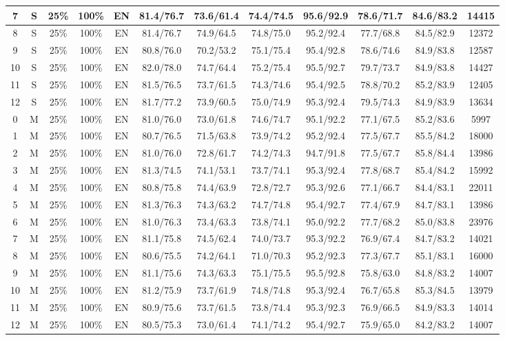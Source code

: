 \begin{table*}
{\begin{tabular}{|c|c|c|c|c||c|c|c|c|c|c||c|}
7 & S & 25\% & 100\% & EN & 81.4/76.7 & 73.6/61.4 & 74.4/74.5 & 95.6/92.9 & 78.6/71.7 & 84.6/83.2 & 14415 \\ \hline
8 & S & 25\% & 100\% & EN & 81.4/76.7 & 74.9/64.5 & 74.8/75.0 & 95.2/92.4 & 77.7/68.8 & 84.5/82.9 & 12372 \\ \hline
9 & S & 25\% & 100\% & EN & 80.8/76.0 & 70.2/53.2 & 75.1/75.4 & 95.4/92.8 & 78.6/74.6 & 84.9/83.8 & 12587 \\ \hline
10 & S & 25\% & 100\% & EN & 82.0/78.0 & 74.7/64.4 & 75.2/75.4 & 95.5/92.7 & 79.7/73.7 & 84.9/83.8 & 14427 \\ \hline
11 & S & 25\% & 100\% & EN & 81.5/76.5 & 73.7/61.5 & 74.3/74.6 & 95.4/92.5 & 78.8/70.2 & 85.2/83.9 & 12405 \\ \hline
12 & S & 25\% & 100\% & EN & 81.7/77.2 & 73.9/60.5 & 75.0/74.9 & 95.3/92.4 & 79.5/74.3 & 84.9/83.9 & 13634 \\ \hline
0 & M & 25\% & 100\% & EN & 81.0/76.0 & 73.0/61.8 & 74.6/74.7 & 95.1/92.2 & 77.1/67.5 & 85.2/83.6 & 5997 \\ \hline
1 & M & 25\% & 100\% & EN & 80.7/76.5 & 71.5/63.8 & 73.9/74.2 & 95.2/92.4 & 77.5/67.7 & 85.5/84.2 & 18000 \\ \hline
2 & M & 25\% & 100\% & EN & 81.0/76.0 & 72.8/61.7 & 74.2/74.3 & 94.7/91.8 & 77.5/67.7 & 85.8/84.4 & 13986 \\ \hline
3 & M & 25\% & 100\% & EN & 81.3/74.5 & 74.1/53.1 & 73.7/74.1 & 95.3/92.4 & 77.8/68.7 & 85.4/84.2 & 15992 \\ \hline
4 & M & 25\% & 100\% & EN & 80.8/75.8 & 74.4/63.9 & 72.8/72.7 & 95.3/92.6 & 77.1/66.7 & 84.4/83.1 & 22011 \\ \hline
5 & M & 25\% & 100\% & EN & 81.3/76.3 & 74.3/63.2 & 74.7/74.8 & 95.4/92.7 & 77.4/67.9 & 84.7/83.1 & 13986 \\ \hline
6 & M & 25\% & 100\% & EN & 81.0/76.3 & 73.4/63.3 & 73.8/74.1 & 95.0/92.2 & 77.7/68.2 & 85.0/83.8 & 23976 \\ \hline
7 & M & 25\% & 100\% & EN & 81.1/75.8 & 74.5/62.4 & 74.0/73.7 & 95.3/92.2 & 76.9/67.4 & 84.7/83.2 & 14021 \\ \hline
8 & M & 25\% & 100\% & EN & 80.6/75.5 & 74.2/64.1 & 71.0/70.3 & 95.2/92.3 & 77.3/67.7 & 85.1/83.1 & 16000 \\ \hline
9 & M & 25\% & 100\% & EN & 81.1/75.6 & 74.3/63.3 & 75.1/75.5 & 95.5/92.8 & 75.8/63.0 & 84.8/83.2 & 14007 \\ \hline
10 & M & 25\% & 100\% & EN & 81.2/75.9 & 73.7/61.9 & 74.8/74.8 & 95.3/92.4 & 76.7/65.8 & 85.3/84.5 & 13979 \\ \hline
11 & M & 25\% & 100\% & EN & 80.9/75.6 & 73.7/61.5 & 73.8/74.4 & 95.3/92.3 & 76.9/66.5 & 84.9/83.3 & 14014 \\ \hline
12 & M & 25\% & 100\% & EN & 80.5/75.3 & 73.0/61.4 & 74.1/74.2 & 95.4/92.7 & 75.9/65.0 & 84.2/83.2 & 14007 \\ \hline
\end{tabular}}
\end{table*}


